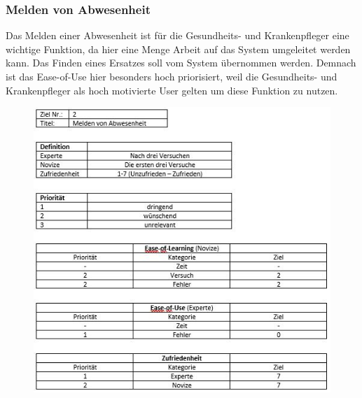 \documentclass[11pt,
paper=a4,
bibtotocnumbered,	  %
liststotocnumbered,  %
DIV=calc,		  %
tablecaptionabove,	  %
headinclude,
]{article}
\begin{document}
\subsubsection{Melden von Abwesenheit}
Das Melden einer Abwesenheit ist für die Gesundheits- und Krankenpfleger eine wichtige Funktion, da hier eine Menge Arbeit auf das System umgeleitet werden kann. Das Finden eines Ersatzes soll vom System übernommen werden. Demnach ist das Ease-of-Use hier besonders hoch priorisiert, weil die Gesundheits- und Krankenpfleger als hoch motivierte User gelten um diese Funktion zu nutzen.
\begin{figure}
\includegraphics[scale=1]{Bilder/meldenAbwesen.jpg}
\end{figure}
\end{document}
